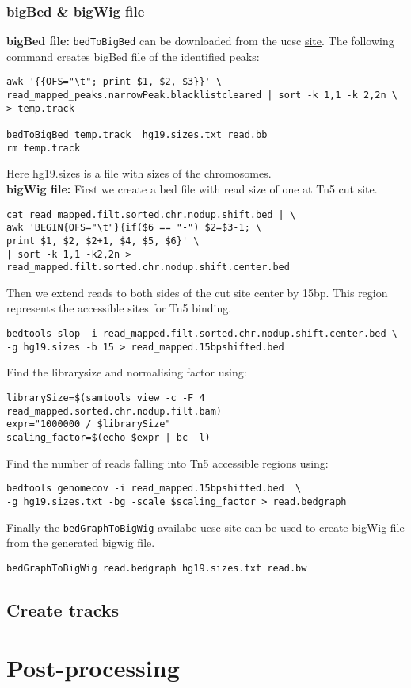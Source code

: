 \documentclass[10pt]{article}
\newcommand{\prog}[1]{\texttt{#1}}
\begin{document}
\subsubsection{bigBed \& bigWig file} 
\textbf{bigBed file:} \prog{bedToBigBed} can be downloaded from the ucsc \href{http://hgdownload.cse.ucsc.edu/admin/exe/}{site}. The following command creates bigBed file of the identified peaks:
\begin{verbatim}
awk '{{OFS="\t"; print $1, $2, $3}}' \
read_mapped_peaks.narrowPeak.blacklistcleared | sort -k 1,1 -k 2,2n \
> temp.track

bedToBigBed temp.track  hg19.sizes.txt read.bb
rm temp.track
\end{verbatim}
Here hg19.sizes is a file with sizes of the chromosomes.\\
\textbf{bigWig file:} First we create a bed file with read size of one at Tn5 cut site.
\begin{verbatim}
cat read_mapped.filt.sorted.chr.nodup.shift.bed | \
awk 'BEGIN{OFS="\t"}{if($6 == "-") $2=$3-1; \
print $1, $2, $2+1, $4, $5, $6}' \
| sort -k 1,1 -k2,2n >  read_mapped.filt.sorted.chr.nodup.shift.center.bed
\end{verbatim}
Then we extend reads to both sides of the cut site center by 15bp. This region represents the accessible sites for Tn5 binding.
\begin{verbatim}
bedtools slop -i read_mapped.filt.sorted.chr.nodup.shift.center.bed \
-g hg19.sizes -b 15 > read_mapped.15bpshifted.bed
\end{verbatim}
Find the librarysize and normalising factor using:
\begin{verbatim}
librarySize=$(samtools view -c -F 4 read_mapped.sorted.chr.nodup.filt.bam)
expr="1000000 / $librarySize"
scaling_factor=$(echo $expr | bc -l)
\end{verbatim}
Find the number of reads falling into Tn5 accessible regions using:
\begin{verbatim}
bedtools genomecov -i read_mapped.15bpshifted.bed  \
-g hg19.sizes.txt -bg -scale $scaling_factor > read.bedgraph
\end{verbatim}
Finally the \prog{bedGraphToBigWig} availabe ucsc \href{http://hgdownload.cse.ucsc.edu/admin/exe/}{site} can be used to create bigWig file from the generated bigwig file.
\begin{verbatim}
bedGraphToBigWig read.bedgraph hg19.sizes.txt read.bw
\end{verbatim}
\subsection{Create tracks}
\section{Post-processing}
\end{document}
